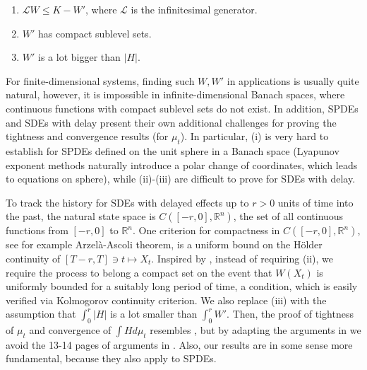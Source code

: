 \documentclass[final]{amsart}
\numberwithin{thm}{section}
\numberwithin{equation}{section}
\newcommand{\R}{\mathbb{R}}
\newcommand{\Ll}{\mathcal{L}}
\begin{document}
\begin{enumerate}[label=(\roman*)]
    \item $\Ll W \leq K - W'$, where $\Ll$ is the infinitesimal generator.
    \item $W'$ has compact sublevel sets.
    \item $W'$ is a lot bigger than $|H|$.
\end{enumerate}

For finite-dimensional systems, finding such $W,W'$ in applications is usually quite natural, however, it is impossible in infinite-dimensional Banach spaces, where continuous functions with compact sublevel sets do not exist. In addition, SPDEs and SDEs with delay present their own additional challenges for proving the tightness and convergence results (for $\mu_t$). In particular, (i) is very hard to establish for SPDEs defined on the unit sphere in a Banach space (Lyapunov exponent methods naturally introduce a polar change of coordinates, which leads to equations on sphere), while (ii)-(iii) are difficult to prove for SDEs with delay.



To track the history for SDEs with delayed effects up to $r > 0$ units of time into the past, the natural state space is $C([-r,0], \R^n)$, the set of all continuous functions from $[-r,0]$ to $\R^n$. One criterion for compactness in $C([-r,0], \R^n)$, see for example Arzel\` a-Ascoli theorem,  is a uniform bound on the H\"{o}lder continuity of $[T-r,T] \ni t \mapsto X_t$. Inspired by \cite{functional}, instead of requiring (ii), we require the process to belong a compact set on the event that $W(X_t)$ is uniformly bounded for a suitably long period of time, a condition, which is easily verified via Kolmogorov continuity criterion. We also replace (iii) with the assumption that $\int_0^r |H|$ is a lot smaller than $\int_0^r W'$. Then, the proof of tightness of $\mu_t$ and convergence of $\int H d\mu_t$ resembles \cite[Section 3]{functional}, but
 by adapting the arguments in \cite{persistence}
we avoid the 13-14 pages of arguments in \cite[Section 4]{functional}. Also, our results are in some sense more fundamental, because they also apply to SPDEs.
\end{document}

